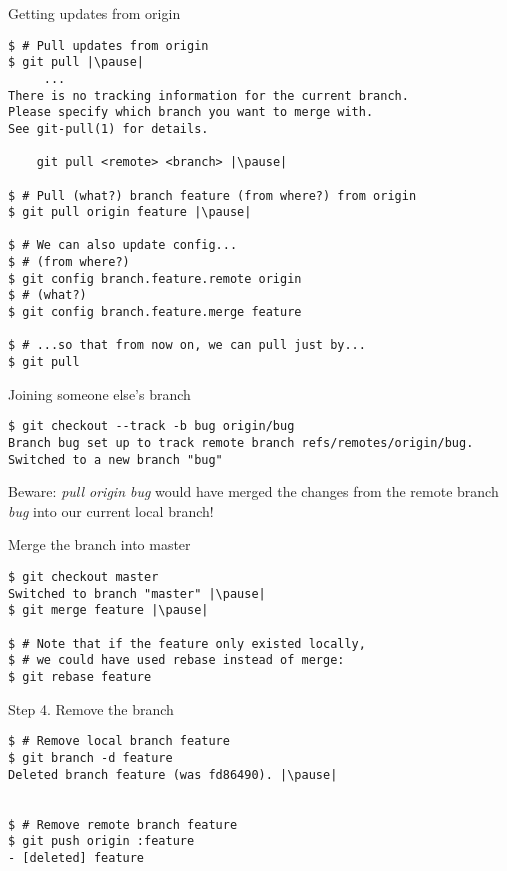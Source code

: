 \begin{frame}[fragile]{Getting updates from origin}
	\begin{lstlisting}
$ # Pull updates from origin
$ git pull |\pause|
     ...
There is no tracking information for the current branch.
Please specify which branch you want to merge with.
See git-pull(1) for details.

    git pull <remote> <branch> |\pause|
    
$ # Pull (what?) branch feature (from where?) from origin
$ git pull origin feature |\pause|

$ # We can also update config...
$ # (from where?)
$ git config branch.feature.remote origin
$ # (what?)
$ git config branch.feature.merge feature

$ # ...so that from now on, we can pull just by...
$ git pull
	\end{lstlisting}
\end{frame}


\begin{frame}[fragile]{Joining someone else's branch}
	\begin{lstlisting}
$ git checkout --track -b bug origin/bug
Branch bug set up to track remote branch refs/remotes/origin/bug.
Switched to a new branch "bug"
	\end{lstlisting}
	
	\pause
	\begin{tiny}
	{\color{eclipsePurple} Beware:} \textit{pull origin bug} would have merged the changes from the remote branch \textit{bug} into our current local branch!
\end{tiny}
\end{frame}

\begin{frame}[fragile]{Merge the branch into master}
  	\begin{lstlisting}
$ git checkout master
Switched to branch "master" |\pause|
$ git merge feature |\pause|

$ # Note that if the feature only existed locally, 
$ # we could have used rebase instead of merge:
$ git rebase feature
	\end{lstlisting}
\end{frame}


\begin{frame}[fragile]{Step 4. Remove the branch}
  	\begin{lstlisting}
$ # Remove local branch feature
$ git branch -d feature
Deleted branch feature (was fd86490). |\pause|


$ # Remove remote branch feature
$ git push origin :feature
- [deleted] feature
	\end{lstlisting}
\end{frame}


